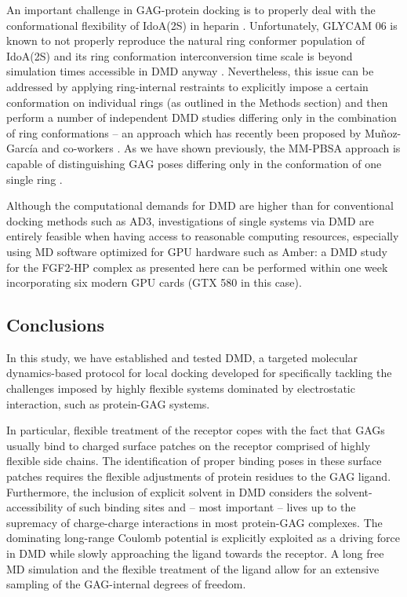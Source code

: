 An important challenge in GAG-protein docking is to properly deal with the
conformational flexibility of IdoA(2S) in heparin
\cite{Mulloy_dyn_conf_heparin_2000, barbero_jacs_2005}. Unfortunately, GLYCAM 06
is known to not properly reproduce the natural ring conformer population of
IdoA(2S) \cite{gandhi_idoa2s_2010} and its ring conformation interconversion
time scale is beyond simulation times accessible in DMD anyway
\cite{almond_jacs_2010}. Nevertheless, this issue can be addressed by applying
ring-internal restraints to explicitly impose a certain conformation on
individual rings (as outlined in the Methods section) and then perform a number
of independent DMD studies differing only in the combination of ring
conformations -- an approach which has recently been proposed by Muñoz-García
and co-workers {\cite{conf_idoa_timeavg_restraints_2013}}. As we have shown
previously, the MM-PBSA approach is capable of distinguishing GAG poses
differing only in the conformation of one single ring
\cite{Samsonov_rings_cr_2013}.

Although the computational demands for DMD are higher than for conventional
docking methods such as AD3, investigations of single systems via DMD are
entirely feasible when having access to reasonable computing resources,
especially using MD software optimized for GPU hardware such as Amber: a DMD
study for the FGF2-HP complex as presented here can be performed within one week
incorporating six modern GPU cards (GTX 580 in this case).

\subsection{Conclusions}

In this study, we have established and tested DMD, a targeted molecular
dynamics-based protocol for local docking developed for specifically tackling
the challenges imposed by highly flexible systems dominated by electrostatic
interaction, such as protein-GAG systems.

In particular, flexible treatment of the receptor copes with the fact that GAGs
usually bind to charged surface patches on the receptor comprised of highly
flexible side chains. The identification of proper binding poses in these
surface patches requires the flexible adjustments of protein residues to the GAG
ligand. Furthermore, the inclusion of explicit solvent in DMD considers the
solvent-accessibility of such binding sites and -- most important -- lives up to
the supremacy of charge-charge interactions in most protein-GAG complexes. The
dominating long-range Coulomb potential is explicitly exploited as a driving
force in DMD while slowly approaching the ligand towards the receptor. A long
free MD simulation and the flexible treatment of the ligand allow for an
extensive sampling of the GAG-internal degrees of freedom.

